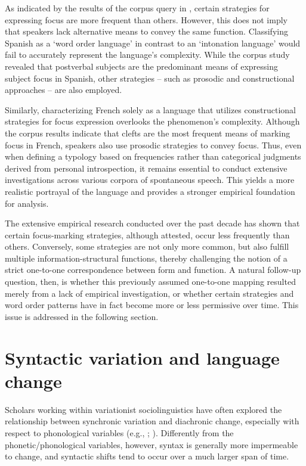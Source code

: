 As indicated by the results of the corpus query in , certain strategies for expressing focus are more frequent than others. However, this does not imply that speakers lack alternative means to convey the same function. Classifying Spanish as a `word order language' in contrast to an `intonation language' would fail to accurately represent the language's complexity. While the corpus study revealed that postverbal subjects are the predominant means of expressing subject focus in Spanish, other strategies -- such as prosodic and constructional approaches -- are also employed. 

Similarly, characterizing French solely as a language that utilizes constructional strategies for focus expression overlooks the phenomenon's complexity. Although the corpus results indicate that clefts are the most frequent means of marking focus in French, speakers also use prosodic strategies to convey focus.
Thus, even when defining a typology based on frequencies rather than categorical judgments derived from personal introspection, it remains essential to conduct extensive investigations across various corpora of spontaneous speech. This yields a more realistic portrayal of the language and provides a stronger empirical foundation for analysis.

The extensive empirical research conducted over the past decade has shown that certain focus-marking strategies, although attested, occur less frequently than others. Conversely, some strategies are not only more common, but also fulfill multiple information-structural functions, thereby challenging the notion of a strict one-to-one correspondence between form and function. A natural follow-up question, then, is whether this previously assumed one-to-one mapping resulted merely from a lack of empirical investigation, or whether certain strategies and word order patterns have in fact become more or less permissive over time. This issue is addressed in the following section.

\section{Syntactic variation and language change} \label{sub:7.4}
Scholars working within
variationist sociolinguistics have often explored the relationship between synchronic variation and diachronic change, especially with respect to phonological variables (e.g., \cite{weinreich1968empirical}; \cite{labov1972sociolinguistic}). Differently from the phonetic/phonological variables, however, syntax is generally more impermeable to change, and syntactic shifts tend to occur over a much larger span of time.

